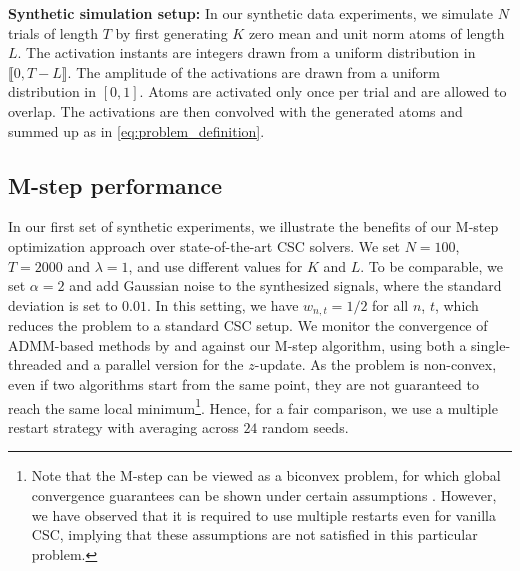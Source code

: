 \textbf{Synthetic simulation setup:} 
In our synthetic data experiments, we simulate $N$ trials of length $T$ by first generating $K$ zero mean and unit norm atoms of length $L$. The  activation instants are integers drawn from a uniform distribution in $\llbracket0, T-L \rrbracket$. The amplitude of the activations are drawn from a uniform distribution in $[0, 1]$. Atoms are activated only once per trial and are allowed to overlap. The activations are then convolved with the generated atoms and summed up as in \eqref{eq:problem_definition}. 


\subsection{M-step performance} 
In our first set of synthetic experiments, we illustrate the benefits of our M-step optimization approach over state-of-the-art CSC solvers. 
%
%
We set $N=100$, $T=2000$ and $\lambda=1$, and use different values for $K$ and $L$. To be comparable, we set $\alpha=2$ and add Gaussian noise to the synthesized signals, where the standard deviation is set to $0.01$. In this setting, we  have $w_{n,t}=1/2$ for all $n$, $t$, which reduces the problem to a standard CSC setup. We monitor the convergence of ADMM-based methods by \citet{heide2015fast} and \citet{wohlberg2016efficient} against our M-step algorithm, using both a single-threaded and a parallel version for the $z$-update. 
As the problem is non-convex, even if two algorithms start from the same point, they are not guaranteed to reach the same local minimum\footnote{Note that the M-step can be viewed as a biconvex problem, for which global convergence guarantees can be shown under certain assumptions \citep{agarwal2014learning, gorski2007biconvex}. However, we have observed that it is required to use multiple restarts even for vanilla CSC, implying that these assumptions are not satisfied in this particular problem.}. 
%
Hence, for a fair comparison, we use a multiple restart strategy with averaging across $24$ random seeds.




